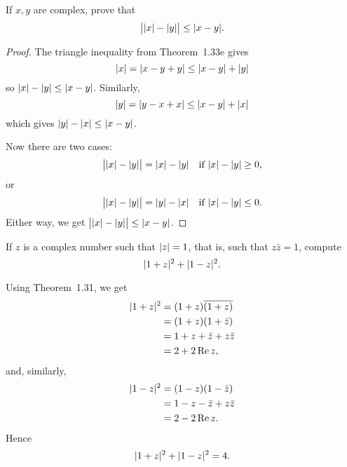  If $x, y$ are complex, prove that
\begin{equation*}
  \big\lvert\lvert{x}\rvert - \lvert{y}\rvert\big\rvert \leq \lvert{x - y}\rvert.
\end{equation*}
\label{exercise-abs-abs-x-minus-abs-y}
\begin{proof}
  The triangle inequality from Theorem~1.33e gives
  \begin{equation*}
    \lvert{x}\rvert = \lvert{x - y + y}\rvert \leq \lvert{x - y}\rvert + \lvert{y}\rvert
  \end{equation*}
  so $\lvert{x}\rvert - \lvert{y}\rvert \leq \lvert{x - y}\rvert$. Similarly,
  \begin{equation*}
    \lvert{y}\rvert = \lvert{y - x + x}\rvert \leq \lvert{x - y}\rvert + \lvert{x}\rvert
  \end{equation*}
  which gives $\lvert{y}\rvert - \lvert{x}\rvert \leq \lvert{x - y}\rvert$.

  Now there are two cases:
  \begin{align*}
    \big\lvert\lvert{x}\rvert - \lvert{y}\rvert\big\rvert = \lvert{x}\rvert - \lvert{y}\rvert
    \quad\text{if $\lvert{x}\rvert - \lvert{y}\rvert \geq 0$,}
  \end{align*}
  or
  \begin{align*}
    \big\lvert\lvert{x}\rvert - \lvert{y}\rvert\big\rvert = \lvert{y}\rvert - \lvert{x}\rvert
    \quad\text{if $\lvert{x}\rvert - \lvert{y}\rvert \leq 0$.}
  \end{align*}
  Either way, we get
  $\big\lvert\lvert{x}\rvert - \lvert{y}\rvert\big\rvert \leq \lvert{x - y}\rvert$.
\end{proof}

 If $z$ is a complex number such that $\lvert{z}\rvert = 1$, that
is, such that $z\bar{z} = 1$, compute
\begin{equation*}
  \lvert{1 + z}\rvert^2 + \lvert{1 - z}\rvert^2.
\end{equation*}
\begin{solution}
  Using Theorem~1.31, we get
  \begin{align*}
    \lvert{1 + z}\rvert^2 &= (1 + z)\overline{(1 + z)} \\
                  &= (1 + z)(1 + \bar{z}) \\
                  &= 1 + z + \bar{z} + z\bar{z} \\
                  &= 2 + 2\operatorname{Re} z,
  \end{align*}
  and, similarly,
  \begin{align*}
    \lvert{1 - z}\rvert^2 &= (1 - z)(1 - \bar{z}) \\
                  &= 1 - z - \bar{z} + z\bar{z} \\
                  &= 2 - 2\operatorname{Re} z.
  \end{align*}
  Hence
  \begin{equation*}
    \lvert{1 + z}\rvert^2 + \lvert{1 - z}\rvert^2 = 4. \qedhere
  \end{equation*}
\end{solution}

